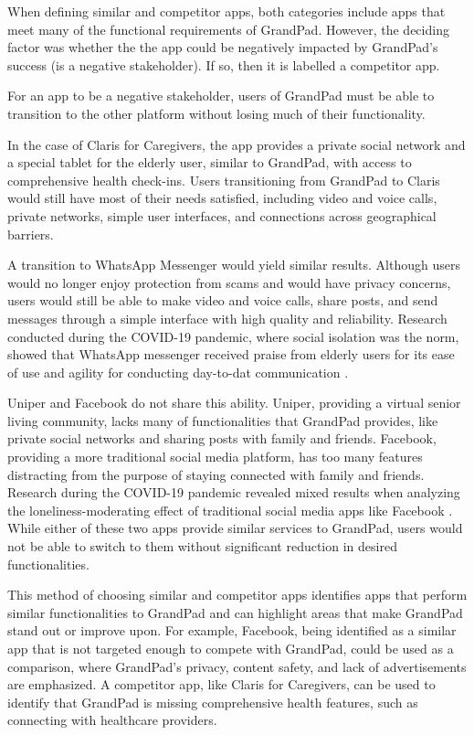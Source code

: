 When defining similar and competitor apps, both categories include apps that
    meet many of the functional requirements of GrandPad.
However, the deciding factor was whether the the app could be negatively
    impacted by GrandPad's success (is a negative stakeholder).
If so, then it is labelled a competitor app.

For an app to be a negative stakeholder, users of GrandPad must be able to
    transition to the other platform without losing much of their functionality.

In the case of Claris for Caregivers, the app provides a private social network
    and a special tablet for the elderly user, similar to GrandPad, with access
    to comprehensive health check-ins.
Users transitioning from GrandPad to Claris would still have most of their needs
    satisfied, including video and voice calls, private networks, simple user
    interfaces, and connections across geographical barriers.

A transition to WhatsApp Messenger would yield similar results.
Although users would no longer enjoy protection from scams and would have
    privacy concerns, users would still be able to make video and voice calls,
    share posts, and send messages through a simple interface with high quality
    and reliability.
Research conducted during the COVID-19 pandemic, where social isolation was the
    norm, showed that WhatsApp messenger received praise from elderly users for
    its ease of use and agility for conducting day-to-dat communication
    \cite{llorente}.

Uniper and Facebook do not share this ability.
Uniper, providing a virtual senior living community, lacks many of
    functionalities that GrandPad provides, like private social networks and
    sharing posts with family and friends.
Facebook, providing a more traditional social media platform, has too many
    features distracting from the purpose of staying connected with family and
    friends.
Research during the COVID-19 pandemic revealed mixed results when analyzing the
    loneliness-moderating effect of traditional social media apps like Facebook
    \cite{longjing}.
While either of these two apps provide similar services to GrandPad, users would
    not be able to switch to them without significant reduction in desired
    functionalities.

This method of choosing similar and competitor apps identifies apps that perform
    similar functionalities to GrandPad and can highlight areas that make
    GrandPad stand out or improve upon.
For example, Facebook, being identified as a similar app that is not targeted
    enough to compete with GrandPad, could be used as a comparison, where
    GrandPad's privacy, content safety, and lack of advertisements are
    emphasized.
A competitor app, like Claris for Caregivers, can be used to identify that
    GrandPad is missing comprehensive health features, such as connecting with
    healthcare providers.

